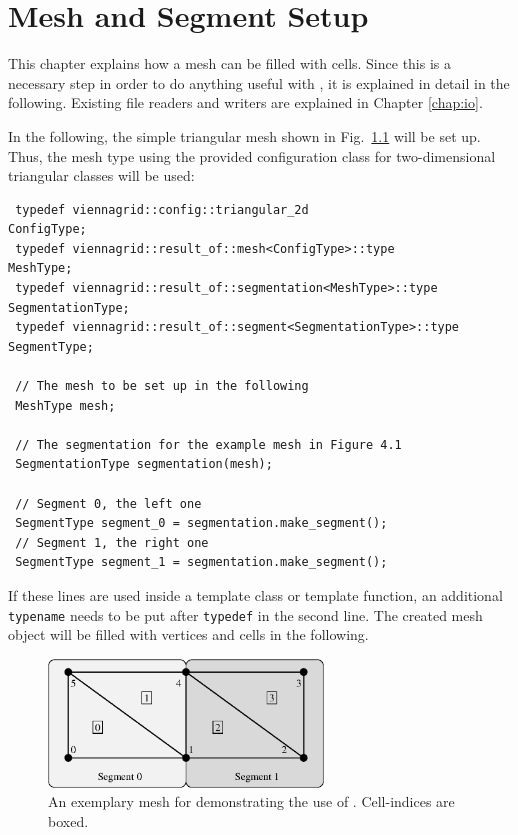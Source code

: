 \chapter{Mesh and Segment Setup} \label{chap:meshsetup}

This chapter explains how a {\ViennaGrid} mesh can be filled with cells. Since this
is a necessary step in order to do anything useful with {\ViennaGrid}, it is explained in detail in the following.
Existing file readers and writers are explained in Chapter \ref{chap:io}.


In the following, the simple triangular mesh shown in Fig.~\ref{fig:samplemesh} will be set up.
Thus, the mesh type using the provided configuration class for two-dimensional triangular classes will be used:
\begin{lstlisting}
 typedef viennagrid::config::triangular_2d                      ConfigType;
 typedef viennagrid::result_of::mesh<ConfigType>::type        MeshType;
 typedef viennagrid::result_of::segmentation<MeshType>::type  SegmentationType;
 typedef viennagrid::result_of::segment<SegmentationType>::type  SegmentType;

 // The mesh to be set up in the following
 MeshType mesh;

 // The segmentation for the example mesh in Figure 4.1
 SegmentationType segmentation(mesh);

 // Segment 0, the left one
 SegmentType segment_0 = segmentation.make_segment();
 // Segment 1, the right one
 SegmentType segment_1 = segmentation.make_segment();
\end{lstlisting}
If these lines are used inside a template class or template function, an additional \lstinline|typename| needs to be put after \lstinline|typedef| in the second line.
The created mesh object will be filled with vertices and cells in the following.

\begin{figure}[tb]
\centering
 \includegraphics[width=0.65\textwidth]{figures/samplemesh.eps}
 \caption{An exemplary mesh for demonstrating the use of {\ViennaGrid}. Cell-indices are boxed.}
 \label{fig:samplemesh}
\end{figure}

